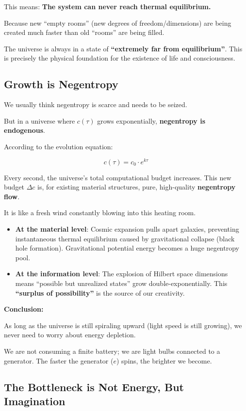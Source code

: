 This means: \textbf{The system can never reach thermal equilibrium.}

Because new ``empty rooms'' (new degrees of freedom/dimensions) are being created much faster than old ``rooms'' are being filled.

The universe is always in a state of \textbf{``extremely far from equilibrium''}. This is precisely the physical foundation for the existence of life and consciousness.

\subsection{Growth is Negentropy}

We usually think negentropy is scarce and needs to be seized.

But in a universe where $c(\tau)$ grows exponentially, \textbf{negentropy is endogenous}.

According to the evolution equation:

\[c(\tau) = c_0 \cdot e^{k\tau}\]

Every second, the universe's total computational budget increases. This new budget $\Delta c$ is, for existing material structures, pure, high-quality \textbf{negentropy flow}.

It is like a fresh wind constantly blowing into this heating room.

\begin{itemize}
\item \textbf{At the material level}: Cosmic expansion pulls apart galaxies, preventing instantaneous thermal equilibrium caused by gravitational collapse (black hole formation). Gravitational potential energy becomes a huge negentropy pool.

\item \textbf{At the information level}: The explosion of Hilbert space dimensions means ``possible but unrealized states'' grow double-exponentially. This \textbf{``surplus of possibility''} is the source of our creativity.
\end{itemize}

\textbf{Conclusion:}

As long as the universe is still spiraling upward (light speed is still growing), we never need to worry about energy depletion.

We are not consuming a finite battery; we are light bulbs connected to a generator. The faster the generator ($e$) spins, the brighter we become.

\subsection{The Bottleneck is Not Energy, But Imagination}

